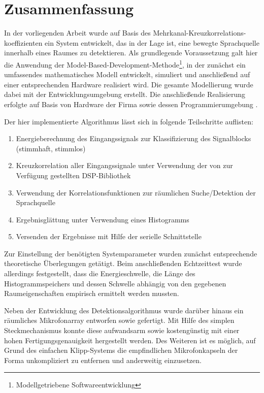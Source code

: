 \chapter{Zusammenfassung}
\label{chap:Zusammenfassung}
In der vorliegenden Arbeit wurde auf Basis des Mehrkanal-Kreuzkorrelations-koeffizienten ein System entwickelt, das in der Lage ist, eine bewegte Sprachquelle innerhalb eines Raumes zu detektieren. Als grundlegende Voraussetzung galt hier die Anwendung der Model-Based-Development-Methode\footnote{Modellgetriebene Softwareentwicklung}, in der zunächst ein umfassendes mathematisches Modell entwickelt, simuliert und anschließend auf einer entsprechenden Hardware realisiert wird. Die gesamte Modellierung wurde dabei mit der Entwicklungsumgebung \matlab erstellt. Die anschließende Realisierung erfolgte auf Basis von Hardware der Firma \ti sowie dessen Programmierumgebung \ccs.


Der hier implementierte Algorithmus lässt sich in folgende Teilschritte auflisten:

\begin{enumerate}
    \item Energieberechnung des Eingangssignals zur Klassifizierung des Signalblocks (stimmhaft, stimmlos)
    \item Kreuzkorrelation aller Eingangssignale unter Verwendung der von \ti zur Verfügung gestellten DSP-Bibliothek
    \item Verwendung der Korrelationsfunktionen zur räumlichen Suche/Detektion der Sprachquelle
    \item Ergebnisglättung unter Verwendung eines Histogramms
    \item Versenden der Ergebnisse mit Hilfe der serielle Schnittstelle
\end{enumerate}

Zur Einstellung der benötigten Systemparameter wurden zunächst entsprechende theoretische Überlegungen getätigt. Beim anschließenden Echtzeittest wurde allerdings festgestellt, dass die Energieschwelle, die Länge des Histogrammspeichers und dessen Schwelle abhängig von den gegebenen Raumeigenschaften empirisch ermittelt werden mussten.

Neben der Entwicklung des Detektionsalgorithmus wurde darüber hinaus ein räumliches Mikrofonarray entworfen sowie gefertigt. Mit Hilfe des simplen Steckmechanismus konnte diese aufwandsarm sowie kostengünstig mit einer hohen Fertigungsgenauigkeit hergestellt werden. Des Weiteren ist es möglich, auf Grund des einfachen Klipp-Systems die empfindlichen Mikrofonkapseln der Forma \sennheiser unkompliziert zu entfernen und anderweitig einzusetzen. 


